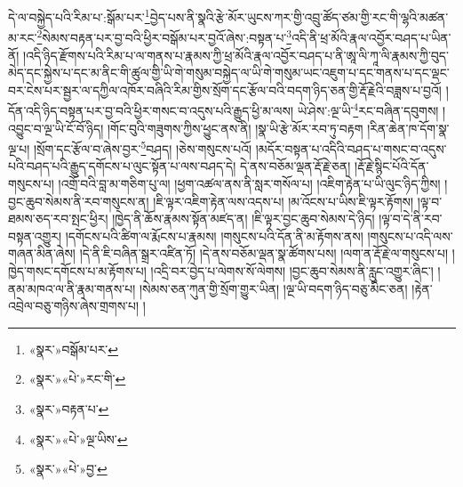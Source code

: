 དེ་ལ་བསྐྱེད་པའི་རིམ་པ་:སྒོམ་པར་\footnote{«སྣར་»བསྒོམ་པར་}བྱེད་པས་ནི་སྣའི་རྩེ་མོར་ཡུངས་ཀར་གྱི་འབྲུ་ཚོད་ཙམ་གྱི་རང་གི་ལྷའི་མཚན་མ་རང་\footnote{«སྣར་»«པེ་»རང་གི་}སེམས་བརྟན་པར་བྱ་བའི་ཕྱིར་བསྒོམ་པར་བྱའོ་ཞེས་:བསྟན་པ་\footnote{«སྣར་»བརྟན་པ་}འདི་ནི་ཕྲ་མོའི་རྣལ་འབྱོར་བཤད་པ་ཡིན་ནོ། །འདི་ཉིད་རྫོགས་པའི་རིམ་པ་ལ་གནས་པ་རྣམས་ཀྱི་ཕྲ་མོའི་རྣལ་འབྱོར་བཤད་པ་ནི་ཨཱ་ལི་ཀཱ་ལི་རྣམས་ཀྱི་བུད་མེད་དང་སྐྱེས་པ་དང་མ་ནིང་གི་ཚུལ་གྱི་ཡི་གེ་གསུམ་བསྐྱེད་ལ་ཡི་གེ་གསུམ་ཡང་འཇུག་པ་དང་གནས་པ་དང་ལྡང་བར་ངེས་པར་སྦྱར་ལ་དཀྱིལ་འཁོར་བཞིའི་རིམ་གྱིས་སྲོག་དང་རྩོལ་བའི་བདག་ཉིད་ཅན་གྱི་རྡོ་རྗེའི་བཟླས་པ་བྱའོ། །དོན་འདི་ཉིད་བསྟན་པར་བྱ་བའི་ཕྱིར་གསང་བ་འདུས་པའི་རྒྱུད་ཕྱི་མ་ལས། ཡེ་ཤེས་:ལྔ་ཡི་\footnote{«སྣར་»«པེ་»ལྔ་ཡིས་}རང་བཞིན་དབུགས། །འབྱུང་བ་ལྔ་ཡི་ངོ་བོ་ཉིད། །གོང་བུའི་གཟུགས་ཀྱིས་ཕྱུང་ནས་ནི། །སྣ་ཡི་རྩེ་མོར་རབ་ཏུ་བརྟག །རིན་ཆེན་ཁ་དོག་སྣ་ལྔ་པ། །སྲོག་དང་རྩོལ་བ་ཞེས་བྱར་\footnote{«སྣར་»«པེ་»བྱ་}བཤད། །ཅེས་གསུངས་པའོ། །མདོར་བསྟན་པ་འདིའི་བཤད་པ་གསང་བ་འདུས་པའི་བཤད་པའི་རྒྱུད་དགོངས་པ་ལུང་སྟོན་པ་ལས་བཤད་དེ། དེ་ནས་བཅོམ་ལྡན་རྡོ་རྗེ་ཅན། །རྡོ་རྗེ་སྙིང་པོའི་དོན་གསུངས་པ། །འགྲོ་བའི་བླ་མ་གཅིག་པུ་ལ། །ཕྱག་འཚལ་ནས་ནི་སླར་གསོལ་པ། །འཇིག་རྟེན་པ་ཡི་ལུང་ཉིད་ཀྱིས། །བྱང་ཆུབ་སེམས་ནི་རབ་གསུངས་ན། །ཇི་ལྟར་འཇིག་རྟེན་ལས་འདས་པ། །མ་འོངས་པ་ཡིས་ཇི་ལྟར་རྟོགས། །ལྟ་བ་ཐམས་ཅད་རབ་སྤང་ཕྱིར། །ཁྱེད་ནི་ཆོས་རྣམས་སྟོན་མཛད་ན། །ཇི་ལྟར་བྱང་ཆུབ་སེམས་དེ་ཉིད། །ལྟ་བ་དེ་ནི་རབ་བསྟན་འགྱུར། །དགོངས་པའི་ཚིག་ལ་རྨོངས་པ་རྣམས། །གསུངས་པའི་དོན་ནི་མ་རྟོགས་ནས། །གསུངས་པ་འདི་ལས་གཞན་མིན་ཞེས། །དེ་ནི་ཇི་བཞིན་སྒྲར་འཛིན་ཏོ། །དེ་ནས་བཅོམ་ལྡན་སྣ་ཚོགས་པས། །ལག་ན་རྡོ་རྗེ་ལ་གསུངས་པ། །ཁྱེད་གསང་དགོངས་པ་མ་རྟོགས་པ། །འདྲི་བར་བྱེད་པ་ལེགས་སོ་ལེགས། །བྱང་ཆུབ་སེམས་ནི་རླུང་འགྱུར་ཞིང་། །ནམ་མཁའ་ལ་ནི་རྣམ་གནས་པ། །སེམས་ཅན་ཀུན་གྱི་སྲོག་གྱུར་ཡིན། །ལྔ་ཡི་བདག་ཉིད་བཅུ་མིང་ཅན། །རྟེན་འབྲེལ་བཅུ་གཉིས་ཞེས་གྲགས་པ། །
